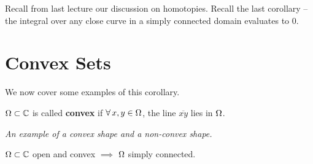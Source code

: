 \setcounter{section}{0}
\setcounter{theorem}{0}


Recall from last lecture our discussion on homotopies. Recall the last corollary -- the integral over any close curve in a simply connected domain evaluates to $0$.

\section{Convex Sets}

We now cover some examples of this corollary.


\begin{definition}
$\Omega \subset \mathbb{C}$ is called \textbf{convex} if $\forall \, x, y \in \Omega$, the line $\overline{ x y }$ lies in $\Omega$.

\begin{center}


\textit{An example of a convex shape and a non-convex shape.}
\end{center}
\end{definition}


\begin{proposition}
$\Omega \subset \mathbb{C}$ open and convex $\implies$ $\Omega$ simply connected.
\end{proposition}

